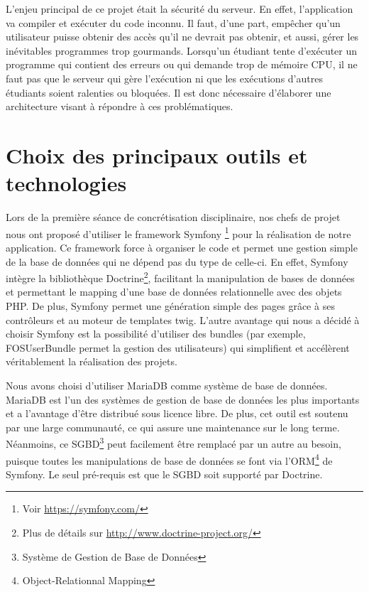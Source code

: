 \par L'enjeu principal de ce projet était la sécurité du serveur. En effet, l'application va compiler et exécuter du code inconnu. Il faut, d'une part, empêcher qu'un utilisateur puisse obtenir des accès qu'il ne devrait pas obtenir, et aussi, gérer les inévitables programmes trop gourmands. Lorsqu'un étudiant tente d'exécuter un programme qui contient des erreurs ou qui demande trop de mémoire CPU, il ne faut pas que le serveur qui gère l'exécution ni que les exécutions d'autres étudiants soient ralenties ou bloquées. Il est donc nécessaire d'élaborer une architecture visant à répondre à ces problématiques.


\section{Choix des principaux outils et technologies}
\label{sec-principaux-outils}
\par Lors de la première séance de concrétisation disciplinaire, nos chefs de projet nous ont proposé d'utiliser le framework Symfony \footnote{Voir \url{https://symfony.com/}} pour la réalisation de notre application. Ce framework force à organiser le code et permet une gestion simple de la base de données qui ne dépend pas du type de celle-ci. En effet, Symfony intègre la bibliothèque Doctrine\footnote{Plus de détails sur \url{http://www.doctrine-project.org/}}, facilitant la manipulation de bases de données et permettant le mapping d'une base de données relationnelle avec des objets PHP. De plus, Symfony permet une génération simple des pages grâce à ses contrôleurs et au moteur de templates twig. L'autre avantage qui nous a décidé à choisir Symfony est la possibilité d'utiliser des bundles (par exemple, FOSUserBundle permet la gestion des utilisateurs) qui simplifient et accélèrent véritablement la réalisation des projets. \\

\par Nous avons choisi d'utiliser MariaDB comme système de base de données. MariaDB est l'un des systèmes de gestion de base de données les plus importants et a l'avantage d'être distribué sous licence libre. De plus, cet outil est soutenu par une large communauté, ce qui assure une maintenance sur le long terme. Néanmoins, ce SGBD\footnote{Système de Gestion de Base de Données} peut facilement être remplacé par un autre au besoin, puisque toutes les manipulations de base de données se font via l'ORM\footnote{Object-Relationnal Mapping} de Symfony. Le seul pré-requis est que le SGBD soit supporté par Doctrine. \\

